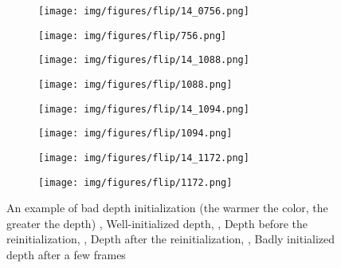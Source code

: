 \begin{figure}[hp]
	\centering
	\begin{subfigure}{0.4\textwidth}
		\centering
		\centering\texttt{[image: img/figures/flip/14\_0756.png]}
		\subcaption{\label{fig:teddyfirst}}
	\end{subfigure}
	\begin{subfigure}{0.4\textwidth}
		\centering
		\centering\texttt{[image: img/figures/flip/756.png]}
		\subcaption{\label{fig:teddyfirst1}}
	\end{subfigure}
	\begin{subfigure}{0.4\textwidth}
		\centering
		\centering\texttt{[image: img/figures/flip/14\_1088.png]}
		\subcaption{\label{fig:teddybefore}}
	\end{subfigure}
	\begin{subfigure}{0.4\textwidth}
		\centering
		\centering\texttt{[image: img/figures/flip/1088.png]}
		\subcaption{\label{fig:teddybefore1}}
	\end{subfigure}
	\begin{subfigure}{0.4\textwidth}
		\centering
		\centering\texttt{[image: img/figures/flip/14\_1094.png]}
		\subcaption{\label{fig:teddyafter}}
	\end{subfigure}
	\begin{subfigure}{0.4\textwidth}
		\centering
		\centering\texttt{[image: img/figures/flip/1094.png]}
		\subcaption{\label{fig:teddyafter1}}
	\end{subfigure}
	\begin{subfigure}{0.4\textwidth}
		\centering
		\centering\texttt{[image: img/figures/flip/14\_1172.png]}
		\subcaption{\label{fig:teddylast}}
	\end{subfigure}
	\begin{subfigure}{0.4\textwidth}
		\centering
		\centering\texttt{[image: img/figures/flip/1172.png]}
		\subcaption{\label{fig:teddylast1}}
	\end{subfigure}
	\caption{\label{fig:teddyflip} An example of bad depth initialization (the warmer the color, the greater the depth) \protect{}, \protect{} Well-initialized depth, \protect{}, \protect{} Depth before the reinitialization, \protect{}, \protect{} Depth after the reinitialization,
		\protect{}, \protect{} Badly initialized depth after a few frames}
\end{figure}

